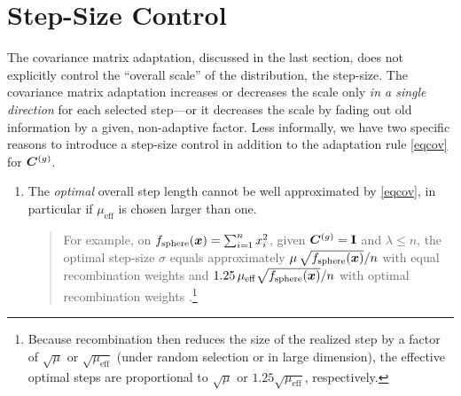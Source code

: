 \documentclass{article} %
\newenvironment{einschub}{%
\begin{small} \begin{quotation}\noindent}{%
  \vspace{0.5ex}\end{quotation}\end{small}%
}
\newcommand{\kom}[1]{}
\newcommand{\ve}[1]{\mathchoice{\mbox{\boldmath$\displaystyle#1$}}
  {\mbox{\boldmath$\textstyle#1$}} {\mbox{\boldmath$\scriptstyle#1$}}
  {\mbox{\boldmath$\scriptscriptstyle#1$}}}
\newcommand{\ma}[1]{\mathchoice{\mbox{\boldmath$\displaystyle#1$}}
  {\mbox{\boldmath$\textstyle#1$}} {\mbox{\boldmath$\scriptstyle#1$}}
  {\mbox{\boldmath$\scriptscriptstyle#1$}}}
\newcommand{\fsphere}{f_{\mathrm{sphere}}}
\newcommand{\N}{\ensuremath{n}}
\newcommand{\mueff}{\ensuremath{\mu_\mathrm{eff}}}
\newcommand{\summ}[2]{\sum_{#1=1}^{#2}}
\newcommand{\lam}{\ensuremath{\lambda}}
\newcommand{\sig}{\ensuremath{\sigma}}
\newcommand{\Cg}{\ensuremath{\ma{C}^{(g)}}}
\newcommand{\Id}{\mathbf{I}}
\begin{document}
\section{Step-Size Control\label{secsscontrol}} 
%
The covariance matrix adaptation, discussed in the last section, does
not explicitly control the ``overall scale'' of the distribution, the
step-size. The covariance matrix adaptation increases or decreases 
the scale only \emph{in a single direction} for each selected step---or it decreases the scale
by fading out old information by a given, non-adaptive factor. 
Less informally, we have two specific reasons to
introduce a step-size control in addition to the adaptation rule
\eqref{eqcov} for $\Cg$.
\begin{enumerate}
  \item The \emph{optimal} overall step length cannot be well approximated by
    \eqref{eqcov}, in particular if $\mueff$ is chosen larger than
    one.
% 
\begin{einschub}%
  For example, on $\fsphere(\ve{x})=\summ{i}{\N}x_i^2$, given $\Cg=\Id$ and
  $\lam\le\N$, 
  the optimal step-size $\sig$ equals approximately
  $\mu\,{\sqrt{\fsphere(\ve{x})}}/{\N}$ with equal recombination weights 
  \cite{Beyer:2001b,Rechenberg:1994} and $1.25\,\mueff{\sqrt{\fsphere(\ve{x})}}/{\N}$ 
  with optimal recombination weights \cite{arnold2006weighted}.\footnote{%
  Because recombination then reduces the size of the realized step by a factor of $\sqrt{\mu}$ or $\sqrt{\mueff}$ (under random selection or in large dimension), the effective optimal steps are proportional to $\sqrt{\mu}$ or $1.25\sqrt{\mueff}$, respectively.
  }\kom{

mueff = (sum |wi|)^2 / sum wi^2 
      = (sum |wi|)^2 / (lam * W_lam)
mueff(Ei) = (sum |Ei|)^2 / sum Ei^2
      = (sum |Ei|)^2 / (lam * W_lam)
      = (sum |Ei|)^2 / lam
      = (lam * 0.79)^2 / lam 
      = 0.79^2 lam 
      = 0.64 lam
 
W_lam := mean wi^2
  W_lam = (sum |wi|)^2 / (mueff * lam) \propto sum |wi|
if sum |wi| = 1 then 
  W_lam is tiny (W_lam = 1 / (mueff * lam))
if wi = Ei then 
  W_lam = 1 and mueff = lam^2 0.798^2 / lam 
                      = lam * 0.798^2
                      = lam * 0.64
Arnold (wi=Ei): 
  wi_opt* = Ei
  sigma_opt* = 1

re-normalized (sum |wi| = 1):
  wi_opt* = Ei / sum |Ei|
  sigma_opt* = sum |E_i| = lam * 0.798 = mueff / 0.798 
             = 1.25 * mueff

}
\end{einschub}
\end{enumerate}
\end{document}
